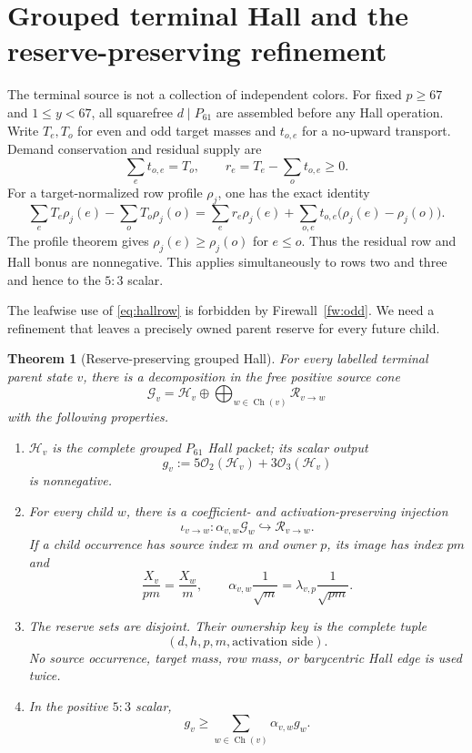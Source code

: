 \documentclass[11pt]{article}
\newtheorem{theorem}{Theorem}[section]
\newcommand{\Obs}{\mathcal O}
\newcommand{\Gcal}{\mathcal G}
\newcommand{\Hcal}{\mathcal H}
\newcommand{\Rcal}{\mathcal R}
\newcommand{\1}{\mathbf 1}
\begin{document}
\section{Grouped terminal Hall and the reserve-preserving refinement}

The terminal source is not a collection of independent colors.  For fixed $p\ge67$ and $1\le y<67$, all squarefree $d\mid P_{61}$ are assembled before any Hall operation.  Write $T_e,T_o$ for even and odd target masses and $t_{o,e}$ for a no-upward transport.  Demand conservation and residual supply are
\[
 \sum_e t_{o,e}=T_o,
 \qquad
 r_e=T_e-\sum_o t_{o,e}\ge0.
\]
For a target-normalized row profile $\rho_j$, one has the exact identity
\begin{equation}\label{eq:hallrow}
 \sum_eT_e\rho_j(e)-\sum_oT_o\rho_j(o)
 =\sum_e r_e\rho_j(e)
 +\sum_{o,e}t_{o,e}\bigl(\rho_j(e)-\rho_j(o)\bigr).
\end{equation}
The profile theorem gives $\rho_j(e)\ge\rho_j(o)$ for $e\le o$.  Thus the residual row and Hall bonus are nonnegative.  This applies simultaneously to rows two and three and hence to the $5{:}3$ scalar.

The leafwise use of \eqref{eq:hallrow} is forbidden by Firewall~\ref{fw:odd}.  We need a refinement that leaves a precisely owned parent reserve for every future child.

\begin{theorem}[Reserve-preserving grouped Hall]\label{thm:rph}
For every labelled terminal parent state $v$, there is a decomposition in the free positive source cone
\[
 \Gcal_v=\Hcal_v\oplus\bigoplus_{w\in\operatorname{Ch}(v)}\Rcal_{v\to w}
\]
with the following properties.
\begin{enumerate}[label=(\roman*)]
\item $\Hcal_v$ is the complete grouped $P_{61}$ Hall packet; its scalar output
\[
 g_v:=5\Obs_2(\Hcal_v)+3\Obs_3(\Hcal_v)
\]
is nonnegative.
\item For every child $w$, there is a coefficient- and activation-preserving injection
\[
 \iota_{v\to w}:\alpha_{v,w}\Gcal_w\hookrightarrow \Rcal_{v\to w}.
\]
If a child occurrence has source index $m$ and owner $p$, its image has index $pm$ and
\[
 \frac{X_v}{pm}=\frac{X_w}{m},
 \qquad
 \alpha_{v,w}\frac1{\sqrt m}
 =\lambda_{v,p}\frac1{\sqrt{pm}}.
\]
\item The reserve sets are disjoint.  Their ownership key is the complete tuple
\[
 (d,h,p,m,\text{activation side}).
\]
No source occurrence, target mass, row mass, or barycentric Hall edge is used twice.
\item In the positive $5{:}3$ scalar,
\begin{equation}\label{eq:reserve-dom}
 g_v\ge \sum_{w\in\operatorname{Ch}(v)}\alpha_{v,w}g_w.
\end{equation}
\end{enumerate}
\end{theorem}
\end{document}
